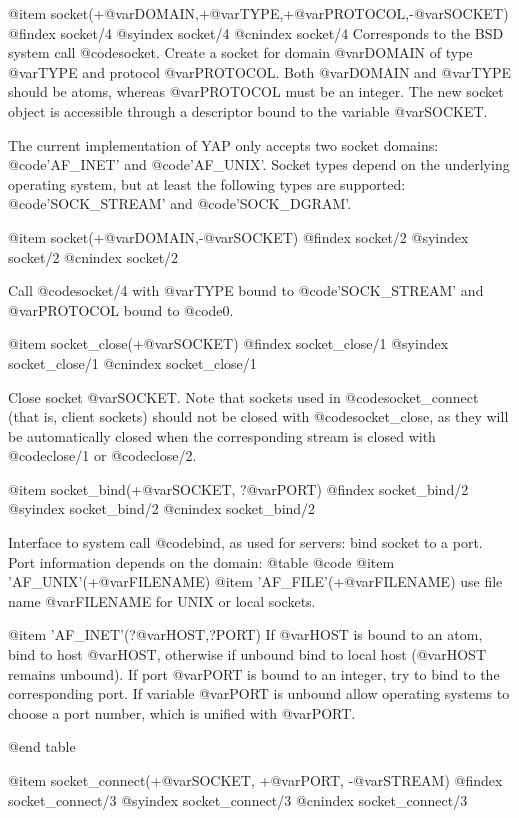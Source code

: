 {{{{{{@item socket(+@var{DOMAIN},+@var{TYPE},+@var{PROTOCOL},-@var{SOCKET})
@findex socket/4
@syindex socket/4
@cnindex socket/4
Corresponds to the BSD system call @code{socket}. Create a socket for
domain @var{DOMAIN} of type @var{TYPE} and protocol
@var{PROTOCOL}. Both @var{DOMAIN} and @var{TYPE} should be atoms,
whereas @var{PROTOCOL} must be an integer. The new socket object is
accessible through a descriptor bound to the variable @var{SOCKET}.

The current implementation of YAP only accepts two socket
domains: @code{'AF_INET'} and @code{'AF_UNIX'}. Socket types depend on the
underlying operating system, but at least the following types are
supported: @code{'SOCK_STREAM'} and @code{'SOCK_DGRAM'}.

@item socket(+@var{DOMAIN},-@var{SOCKET})
@findex socket/2
@syindex socket/2
@cnindex socket/2

Call @code{socket/4} with @var{TYPE} bound to @code{'SOCK_STREAM'} and
@var{PROTOCOL} bound to @code{0}.

@item socket_close(+@var{SOCKET})
@findex socket_close/1
@syindex socket_close/1
@cnindex socket_close/1

Close socket @var{SOCKET}. Note that sockets used in
@code{socket_connect} (that is, client sockets) should not be closed with
@code{socket_close}, as they will be automatically closed when the
corresponding stream is closed with @code{close/1} or @code{close/2}.

@item socket_bind(+@var{SOCKET}, ?@var{PORT})
@findex socket_bind/2
@syindex socket_bind/2
@cnindex socket_bind/2

Interface to system call @code{bind}, as used for servers: bind socket
to a port. Port information depends on the domain:
@table @code
@item 'AF_UNIX'(+@var{FILENAME})
@item 'AF_FILE'(+@var{FILENAME})
use file name @var{FILENAME} for UNIX or local sockets.

@item 'AF_INET'(?@var{HOST},?PORT)
If @var{HOST} is bound to an atom, bind to host @var{HOST}, otherwise
if unbound bind to local host (@var{HOST} remains unbound). If port
@var{PORT} is bound to an integer, try to bind to the corresponding
port. If variable @var{PORT} is unbound allow operating systems to
choose a port number, which is unified with @var{PORT}.

@end table

@item socket_connect(+@var{SOCKET}, +@var{PORT}, -@var{STREAM})
@findex socket_connect/3
@syindex socket_connect/3
@cnindex socket_connect/3

}}}}}}
